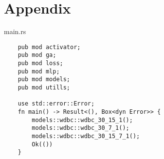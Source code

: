 \renewcommand{\listingscaption}{Source Code}
\newenvironment{code}{\captionsetup{type=listing}}{}
\section*{Appendix}

\begin{code}
\caption{main.rs}
\begin{verbatim}  
    pub mod activator;
    pub mod ga;
    pub mod loss;
    pub mod mlp;
    pub mod models;
    pub mod utills;
    
    use std::error::Error;
    fn main() -> Result<(), Box<dyn Error>> {
        models::wdbc::wdbc_30_15_1();
        models::wdbc::wdbc_30_7_1();
        models::wdbc::wdbc_30_15_7_1();
        Ok(())
    }
\end{verbatim}
\end{code}

